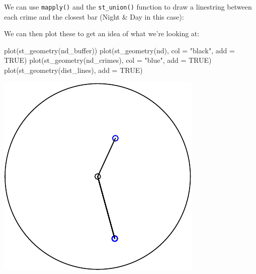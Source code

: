 \documentclass[
]{book}
\makeatletter
\newenvironment{Shaded}{\begin{snugshade}}{\end{snugshade}}
\newcommand{\AttributeTok}[1]{\textcolor[rgb]{0.61,0.61,0.61}{#1}}
\newcommand{\CommentTok}[1]{\textcolor[rgb]{0.37,0.37,0.37}{\textit{#1}}}
\newcommand{\ConstantTok}[1]{\textcolor[rgb]{0,0,0}{#1}}
\newcommand{\ControlFlowTok}[1]{\textcolor[rgb]{0.27,0.27,0.27}{\textbf{#1}}}
\newcommand{\FunctionTok}[1]{\textcolor[rgb]{0,0,0}{#1}}
\newcommand{\NormalTok}[1]{#1}
\newcommand{\OtherTok}[1]{\textcolor[rgb]{0.37,0.37,0.37}{#1}}
\newcommand{\SpecialCharTok}[1]{\textcolor[rgb]{0,0,0}{#1}}
\newcommand{\StringTok}[1]{\textcolor[rgb]{0.5,0.5,0.5}{#1}}
\newenvironment{kframe}{%
\medskip{}
\setlength{\fboxsep}{.8em}
 \def\at@end@of@kframe{}%
 \ifinner\ifhmode%
  \def\at@end@of@kframe{\end{minipage}}%
  \begin{minipage}{\columnwidth}%
 \fi\fi%
 \def\FrameCommand##1{\hskip\@totalleftmargin \hskip-\fboxsep
 \colorbox{shadecolor}{##1}\hskip-\fboxsep
     \hskip-\linewidth \hskip-\@totalleftmargin \hskip\columnwidth}%
 \MakeFramed {\advance\hsize-\width
   \@totalleftmargin\z@ \linewidth\hsize
   \@setminipage}}%
 {\par\unskip\endMakeFramed%
 \at@end@of@kframe}
\renewenvironment{Shaded}{\begin{kframe}}{\end{kframe}}
\makeatother
\begin{document}
We can use \texttt{mapply()} and the \texttt{st\_union()} function to draw a linestring between each crime and the closest bar (Night \& Day in this case):

\begin{Shaded}
\end{Shaded}

We can then plot these to get an idea of what we're looking at:

\begin{Shaded}
\begin{Highlighting}[]
\FunctionTok{plot}\NormalTok{(}\FunctionTok{st\_geometry}\NormalTok{(nd\_buffer))}
\FunctionTok{plot}\NormalTok{(}\FunctionTok{st\_geometry}\NormalTok{(nd), }\AttributeTok{col =} \StringTok{"black"}\NormalTok{, }\AttributeTok{add =} \ConstantTok{TRUE}\NormalTok{)}
\FunctionTok{plot}\NormalTok{(}\FunctionTok{st\_geometry}\NormalTok{(nd\_crimes), }\AttributeTok{col =} \StringTok{"blue"}\NormalTok{, }\AttributeTok{add =} \ConstantTok{TRUE}\NormalTok{)}
\FunctionTok{plot}\NormalTok{(}\FunctionTok{st\_geometry}\NormalTok{(dist\_lines), }\AttributeTok{add =} \ConstantTok{TRUE}\NormalTok{)}
\end{Highlighting}
\end{Shaded}

\includegraphics{crime_mapping_files/figure-latex/unnamed-chunk-44-1.pdf}
\end{document}
